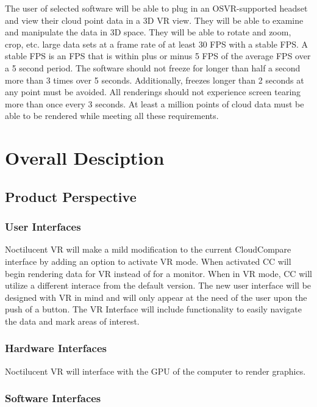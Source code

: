 \documentclass{article}
\begin{document}
The user of selected software will be able to plug in an OSVR-supported headset and view their cloud point data in a 3D VR view.
They will be able to examine and manipulate the data in 3D space. 
They will be able to rotate and zoom, crop, etc. large data sets at a frame rate of at least 30 FPS with a stable FPS.
A stable FPS is an FPS that is within plus or minus 5 FPS of the average FPS over a 5 second period.
The software should not freeze for longer than half a second more than 3 times over 5 seconds.
Additionally, freezes longer than 2 seconds at any point must be avoided.
All renderings should not experience screen tearing more than once every 3 seconds.
At least a million points of cloud data must be able to be rendered while meeting all these requirements.


\section{Overall Desciption}
\subsection{Product Perspective}

\subsubsection{User Interfaces}

Noctilucent VR will make a mild modification to the current CloudCompare interface by adding an option to activate VR mode. 
When activated CC will begin rendering data for VR instead of for a monitor.
When in VR mode, CC will utilize a different interace from the default version.
The new user interface will be designed with VR in mind and will only appear at the need of the user upon the push of a button.
The VR Interface will include functionality to easily navigate the data and mark areas of interest.

\subsubsection{Hardware Interfaces}

Noctilucent VR will interface with the GPU of the computer to render graphics.

\subsubsection{Software Interfaces}
\end{document}
